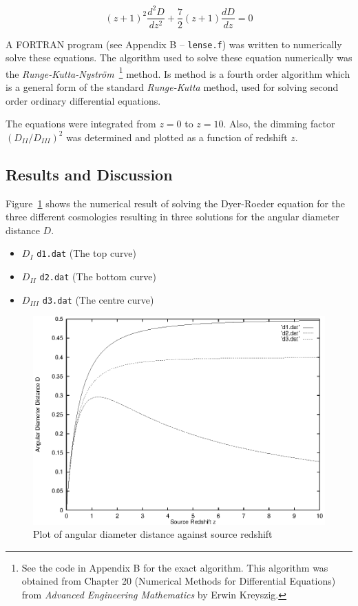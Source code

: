 \documentclass[a4paper]{IEEEtran}
\begin{document}
\begin{equation}
    (z+1)^2 \frac{d^2D}{dz^2} + \frac{7}{2}(z+1)\frac{dD}{dz} = 0
\end{equation}

A FORTRAN program (see Appendix B -- \texttt{lense.f}) was written
to numerically solve these equations. The algorithm used to solve these
equation numerically was the \emph{Runge-Kutta-Nystr\"{o}m}~\footnote{
See the code in Appendix B for the exact algorithm. This algorithm
was obtained from Chapter 20 (Numerical Methods for Differential Equations)
from \emph{Advanced Engineering Mathematics} by Erwin Kreyszig.}
method.  Is method is a fourth order algorithm which is a general form 
of the standard \emph{Runge-Kutta} method, used for solving second order 
ordinary differential equations.

The equations were integrated from $z = 0$ to $z = 10$. 
Also, the dimming factor $(D_{II}/D_{III})^2$ was determined and plotted
as a function of redshift $z$.

\subsection{Results and Discussion} 
Figure~\ref{fig:diam-vs-redshift} shows the numerical result of solving the Dyer-Roeder
equation for the three different cosmologies resulting in three
solutions for the angular diameter distance $D$.
\begin{itemize}
    \item $D_{I}$   \texttt{d1.dat} (The top curve)
    \item $D_{II}$  \texttt{d2.dat} (The bottom curve)
    \item $D_{III}$ \texttt{d3.dat} (The centre curve)
\end{itemize}

\begin{figure}
    \caption{Plot of angular diameter distance against source redshift} 
    \label{fig:diam-vs-redshift} 
    \begin{center}
        \includegraphics[width=\columnwidth]{results/cosmo_all.eps}
    \end{center}
\end{figure}
\end{document}

